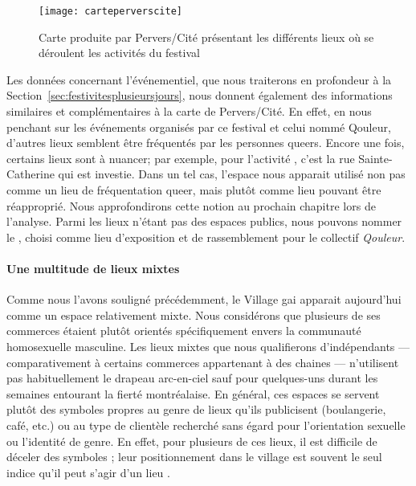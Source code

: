 \begin{figure}[ht]
 \centering
 \texttt{[image: carteperverscite]}
 \caption[Carte des activités de Pervers/Cité]{Carte produite par Pervers/Cité présentant les différents lieux où se déroulent les activités du festival}\label{fig:carteperverscite}
 \source{\agq{}}
\end{figure}

Les données concernant l'événementiel, que nous traiterons en profondeur à la Section~\ref{sec:festivitesplusieursjours}, nous donnent également des informations similaires et complémentaires à la carte de Pervers/Cité.
En effet, en nous penchant sur les événements organisés par ce festival et celui nommé Qouleur, d'autres lieux semblent être fréquentés par les personnes queers.
Encore une fois, certains lieux sont à nuancer; par exemple, pour l'activité , c'est la rue Sainte-Catherine qui est investie.
Dans un tel cas, l'espace nous apparait utilisé non pas comme un lieu de fréquentation queer, mais plutôt comme lieu pouvant être réapproprié.
Nous approfondirons cette notion au prochain chapitre lors de l'analyse.
Parmi les lieux n'étant pas des espaces publics, nous pouvons nommer le \mai{}, choisi comme lieu d'exposition et de rassemblement pour le collectif \emph{Qouleur}.

\paragraph{Une multitude de lieux mixtes}
Comme nous l'avons souligné précédemment, le Village gai apparait aujourd'hui comme un espace relativement mixte.
Nous considérons que plusieurs de ses commerces étaient plutôt orientés spécifiquement envers la communauté homosexuelle masculine.
Les lieux mixtes que nous qualifierons d'indépendants --- comparativement à certains commerces appartenant à des chaines --- n'utilisent pas habituellement le drapeau arc-en-ciel sauf pour quelques-uns durant les semaines entourant la fierté montréalaise.
En général, ces espaces se servent plutôt des symboles propres au genre de lieux qu'ils publicisent (boulangerie, café, etc.) ou au type de clientèle recherché sans égard pour l'orientation sexuelle ou l'identité de genre.
En effet, pour plusieurs de ces lieux, il est difficile de déceler des symboles \lgbt{}; leur positionnement dans le village est souvent le seul indice qu'il peut s'agir d'un lieu \lgbt{}.


